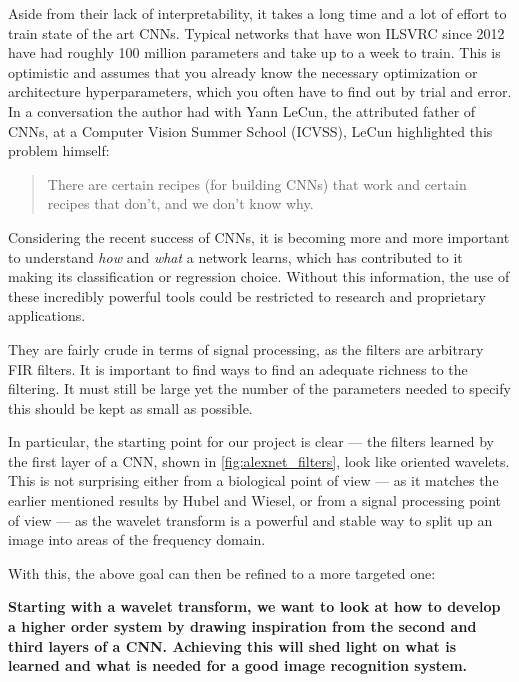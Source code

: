 Aside from their lack of interpretability, it takes a long time and a lot of
effort to train state of the art CNNs. Typical networks that have won ILSVRC
since 2012 have had roughly 100 million parameters and take up to a week to train. This 
is optimistic and assumes that you already know the necessary optimization or
architecture hyperparameters, which you often have to find out by trial and error. 
In a conversation the author had with Yann LeCun, the attributed father of
CNNs, at a Computer Vision Summer School (ICVSS), LeCun highlighted this problem
himself:
\begin{quote}
  There are certain recipes (for building CNNs) that work and certain recipes
  that don't, and we don't know why.
\end{quote}

Considering the recent success of CNNs, it is becoming more and more
important to understand \emph{how} and \emph{what} a network learns, which
has contributed to it making its classification or regression choice.
Without this information, the use of these incredibly powerful tools could be
restricted to research and proprietary applications.

They are fairly crude in terms of signal processing, as
the filters are arbitrary FIR filters. It is important to find ways to find an
adequate richness to the filtering. It must still be large yet the number of the
parameters needed to specify this should be kept as small as possible.

  In particular, the starting point for our project is clear --- the filters
  learned by the first layer of a CNN, shown in
  \autoref{fig:alexnet_filters},
  look like oriented wavelets. This is not surprising either from a biological
  point of view --- as it matches the earlier mentioned results by Hubel and
  Wiesel, or from a signal processing point of view --- as the wavelet
  transform is a powerful and stable way to split up an image into areas of the
  frequency domain.
  

  With this, the above goal can then be refined to a more targeted one:

  \newpage
  \begin{goals}\bf
    Starting with a wavelet transform, we want to look at how to develop
    a higher order system by drawing inspiration from the second and third
    layers of a CNN\@. Achieving this will shed light on what is learned and what
    is needed for a good image recognition system.
  \end{goals}


